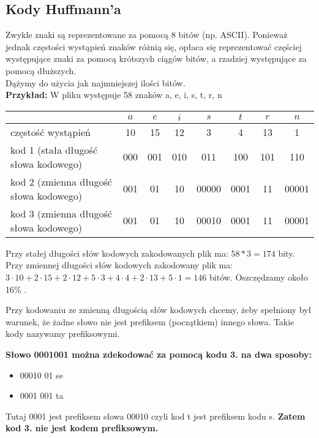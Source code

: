 \subsection{Kody Huffmann'a}
Zwykle znaki są reprezentowane za pomocą 8 bitów (np. ASCII). Ponieważ jednak częstości wystąpień znaków różnią się, opłaca się reprezentować częściej występujące znaki za pomocą krótszych ciągów bitów, a rzadziej  występujące za pomocą dłuższych.\\

Dążymy do użycia jak najmniejszej ilości bitów.\\

\textbf{Przykład:} W pliku występuje 58 znaków a, e, i, s, t, r, n\\
\begin{center}
\begin{tabular}{ l | c | c | c | c | c | c | c }
  	 										& $a$	& $e$ 	& $i$ 	& $s$ 	& $t$ 	& $r$ 	& $n$ 	\\ \hline
  częstość wystąpień 						& 10	&  15  	& 12	&  3  	&  4	&  13	&  1 	\\ \hline
  kod 1 (stała długość słowa kodowego) 		& 000 	& 001 	& 010	& 011 	& 100	& 101	& 110 	\\ \hline
  kod 2 (zmienna długość słowa kodowego) 	& 001 	& 01 	& 10	& 00000 & 0001	& 11	& 00001 \\ \hline
  kod 3 (zmienna długość słowa kodowego) 	& 001 	& 01 	& 10	& 00010 & 0001	& 11	& 00001 \\  
\end{tabular}
\end{center}

Przy stałej długości słów kodowych zakodowanych plik ma: $58*3=174$ bity. \\
Przy zmiennej długości słów kodowych zakodowany plik ma: $3 \cdot 10+2 \cdot 15+2 \cdot 12+5 \cdot 3+4 \cdot 4+2 \cdot 13+5 \cdot 1 = 146$ bitów. Oszczędzamy około 16$\%$ .

Przy kodowaniu ze zmienną długością słów kodowych chcemy, żeby spełniony był warunek, że żadne słowo nie jest prefiksem (początkiem) innego słowa. Takie kody nazywamy prefiksowymi. 

\textbf{Słowo 0001001 można zdekodować za pomocą kodu 3. na dwa sposoby:}
\begin{itemize}
	\item 00010 01 se
	\item 0001 001 ta 
\end{itemize}
Tutaj 0001 jest prefiksem słowa 00010 czyli kod t jest prefiksem kodu s. \textbf{Zatem kod 3. nie jest kodem prefiksowym.}

